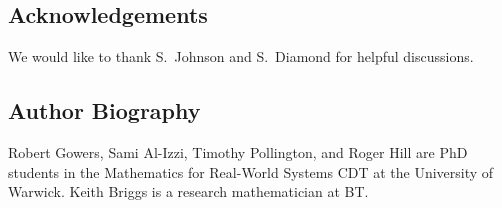 \documentclass[twocolumn,secnumarabic,amssymb, nobibnotes, aps, prl,superscriptaddress]{revtex4-1}
\begin{document}
\subsection*{Acknowledgements}
\noindent{}We would like to thank S.~Johnson and S.~Diamond for helpful discussions. 

\subsection*{Author Biography}
\noindent{}Robert Gowers, Sami Al-Izzi, Timothy Pollington, and Roger Hill are PhD students in the Mathematics for Real-World Systems CDT at the University of Warwick.  Keith Briggs is a research mathematician at BT.

\vspace{0.2cm}
 


\end{document}
